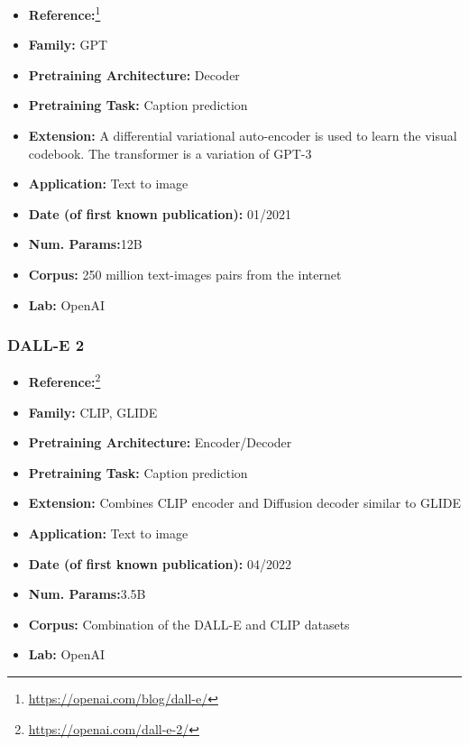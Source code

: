 \documentclass{article}
\begin{document}
            \begin{itemize}
                \item \textbf{Reference:}\footnote{\url{https://openai.com/blog/dall-e/}}\cite{ramesh2021zero}
                \item \textbf{Family:} GPT 
                \item \textbf{Pretraining Architecture:} Decoder
                \item \textbf{Pretraining Task:} Caption prediction
                \item \textbf{Extension:} A differential variational auto-encoder is used to learn the visual codebook. The transformer is a variation of GPT-3  
                \item \textbf{Application:} Text to image
                \item \textbf{Date (of first known publication):} 01/2021
                \item \textbf{Num. Params:}12B
                \item \textbf{Corpus:} 250 million text-images pairs from the internet
                \item \textbf{Lab:} OpenAI
            \end{itemize}
            
\subsubsection{DALL-E 2}

            \begin{itemize}
                \item \textbf{Reference:}\footnote{\url{https://openai.com/dall-e-2/}}\cite{ramesh2022hierarchical}
                \item \textbf{Family:} CLIP, GLIDE 
                \item \textbf{Pretraining Architecture:} Encoder/Decoder
                \item \textbf{Pretraining Task:} Caption prediction
                \item \textbf{Extension:} Combines CLIP encoder and Diffusion decoder similar to GLIDE  
                \item \textbf{Application:} Text to image
                \item \textbf{Date (of first known publication):} 04/2022
                \item \textbf{Num. Params:}3.5B
                \item \textbf{Corpus:} Combination of the DALL-E and CLIP datasets
                \item \textbf{Lab:} OpenAI
            \end{itemize}
\end{document}
